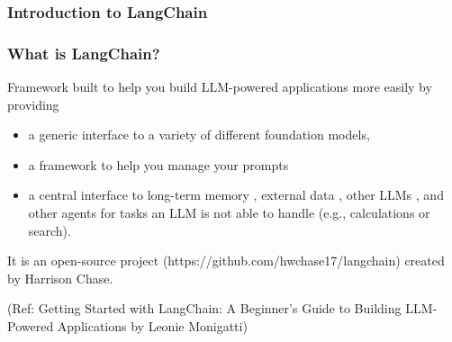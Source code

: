 \begin{frame}[fragile]\frametitle{Introduction to LangChain}



\begin{frame}[fragile]\frametitle{What is LangChain?}

Framework built to help you build LLM-powered applications more easily by providing 

\begin{itemize}
\item a generic interface to a variety of different foundation models,
\item a framework to help you manage your prompts 
\item a central interface to long-term memory , external data , other LLMs , and other agents for tasks an LLM is not able to handle (e.g., calculations or search).
\end{itemize}

It is an open-source project (https://github.com/hwchase17/langchain) created by Harrison Chase.

{\tiny (Ref: Getting Started with LangChain: A Beginner’s Guide to Building LLM-Powered Applications by Leonie Monigatti)}
\end{frame}




\end{frame}
